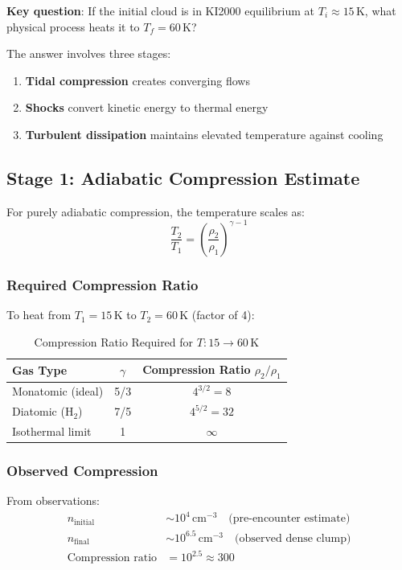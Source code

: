 \documentclass[11pt,a4paper]{article}
\newcommand{\cmcubed}{\,\mathrm{cm^{-3}}}
\begin{document}
\textbf{Key question}: If the initial cloud is in KI2000 equilibrium at
$T_i \approx 15\,\mathrm{K}$, what physical process heats it to $T_f = 60\,\mathrm{K}$?

The answer involves three stages:
\begin{enumerate}
    \item \textbf{Tidal compression} creates converging flows
    \item \textbf{Shocks} convert kinetic energy to thermal energy
    \item \textbf{Turbulent dissipation} maintains elevated temperature against cooling
\end{enumerate}

\subsection{Stage 1: Adiabatic Compression Estimate}

For purely adiabatic compression, the temperature scales as:
\begin{equation}
    \frac{T_2}{T_1} = \left(\frac{\rho_2}{\rho_1}\right)^{\gamma - 1}
\end{equation}

\subsubsection{Required Compression Ratio}
To heat from $T_1 = 15\,\mathrm{K}$ to $T_2 = 60\,\mathrm{K}$ (factor of 4):

\begin{table}[h]
\centering
\caption{Compression Ratio Required for $T: 15 \to 60\,\mathrm{K}$}
\begin{tabular}{lcc}
\toprule
\textbf{Gas Type} & $\gamma$ & \textbf{Compression Ratio} $\rho_2/\rho_1$ \\
\midrule
Monatomic (ideal) & 5/3 & $4^{3/2} = 8$ \\
Diatomic (H$_2$) & 7/5 & $4^{5/2} = 32$ \\
Isothermal limit & 1 & $\infty$ \\
\bottomrule
\end{tabular}
\end{table}

\subsubsection{Observed Compression}
From observations:
\begin{align}
    n_\mathrm{initial} &\sim 10^4\cmcubed \quad \text{(pre-encounter estimate)} \\
    n_\mathrm{final} &\sim 10^{6.5}\cmcubed \quad \text{(observed dense clump)} \\
    \text{Compression ratio} &= 10^{2.5} \approx 300
\end{align}
\end{document}

